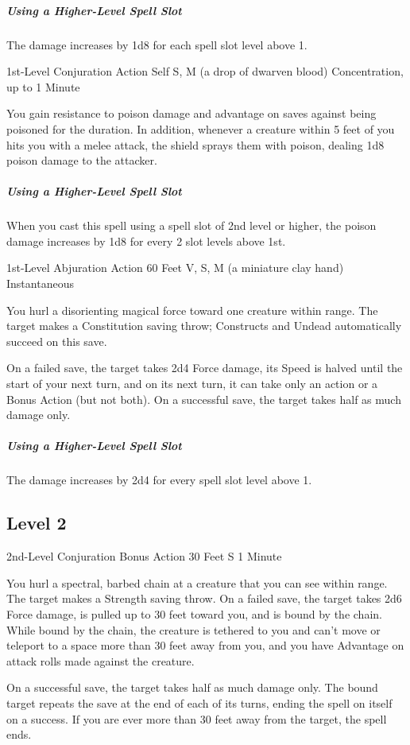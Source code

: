 \documentclass[letterpaper,openany,oneside,twocolumn]{book}
\begin{document}
\subparagraph*{Using a Higher-Level Spell Slot} The damage increases by 1d8 for each spell slot level above 1.

	{1st-Level Conjuration}
	{Action}
	{Self}
	{S, M (a drop of dwarven blood)}
	{Concentration, up to 1 Minute}

You gain resistance to poison damage and advantage on saves against being poisoned for the duration. In addition, whenever a creature within 5 feet of you hits you with a melee attack, the shield sprays them with poison, dealing 1d8 poison damage to the attacker.

\subparagraph*{Using a Higher-Level Spell Slot} When you cast this spell using a spell slot of 2nd level or higher, the poison damage increases by 1d8 for every 2 slot levels above 1st.

	{1st-Level Abjuration}
	{Action}
	{60 Feet}
	{V, S, M (a miniature clay hand)}
	{Instantaneous}

You hurl a disorienting magical force toward one creature within range. The target makes a Constitution saving throw; Constructs and Undead automatically succeed on this save.

On a failed save, the target takes 2d4 Force damage, its Speed is halved until the start of your next turn, and on its next turn, it can take only an action or a Bonus Action (but not both). On a successful save, the target takes half as much damage only.

\subparagraph*{Using a Higher-Level Spell Slot} The damage increases by 2d4 for every spell slot level above 1.

\subsection*{Level 2}

	{2nd-Level Conjuration}
	{Bonus Action}
	{30 Feet}
	{S}
	{1 Minute}

You hurl a spectral, barbed chain at a creature that you can see within range. The target makes a Strength saving throw. On a failed save, the target takes 2d6 Force damage, is pulled up to 30 feet toward you, and is bound by the chain. While bound by the chain, the creature is tethered to you and can't move or teleport to a space more than 30 feet away from you, and you have Advantage on attack rolls made against the creature.

On a successful save, the target takes half as much damage only. The bound target repeats the save at the end of each of its turns, ending the spell on itself on a success. If you are ever more than 30 feet away from the target, the spell ends.
\end{document}
